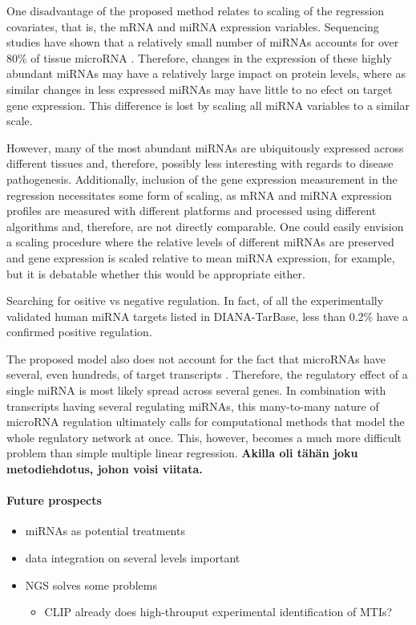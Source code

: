 One disadvantage of the proposed method relates to scaling of the regression
covariates, that is, the mRNA and miRNA expression variables. Sequencing studies have shown
that a relatively small number of miRNAs accounts for over 80\% of tissue microRNA
\citep{Landgraf2007}. Therefore, changes in the expression of these highly
abundant miRNAs may have a relatively large impact on protein levels, where as
similar changes in less expressed miRNAs may have little to no efect on target gene
expression. This difference is lost by scaling all miRNA variables to a similar scale.

However, many of the most abundant miRNAs are ubiquitously expressed across
different tissues \citep{Landgraf2007} and, therefore, possibly less
interesting with regards to disease pathogenesis. Additionally, inclusion of
the gene expression measurement in the regression necessitates some form of
scaling, as mRNA and miRNA expression profiles are measured with different platforms
and processed using different algorithms and, therefore, are not directly
comparable. One could easily envision a scaling procedure where the relative
levels of different miRNAs are preserved and gene expression is scaled
relative to mean miRNA expression, for example, but it is debatable whether
this would be appropriate either.

Searching for ositive vs negative regulation. In fact, of all the experimentally validated
human miRNA targets listed in DIANA-TarBase, less than 0.2\% have
a confirmed positive regulation. 

The proposed model also does not account for the fact that microRNAs have
several, even hundreds, of target transcripts \citep{}. Therefore, the regulatory
effect of a single miRNA is most likely spread across several genes. In
combination with transcripts having several regulating miRNAs, this many-to-many
nature of microRNA regulation ultimately calls for computational methods
that model the whole regulatory network at once. This, however, becomes a much
more difficult problem than simple multiple linear regression. \textbf{Akilla
oli tähän joku metodiehdotus, johon voisi viitata.}

\paragraph{Future prospects}

\begin{itemize}
	\item miRNAs as potential treatments
	\item data integration on several levels important
	\item NGS solves some problems
	\begin{itemize}
		\item CLIP already does high-throuput experimental identification of MTIs?
	\end{itemize}
\end{itemize}

